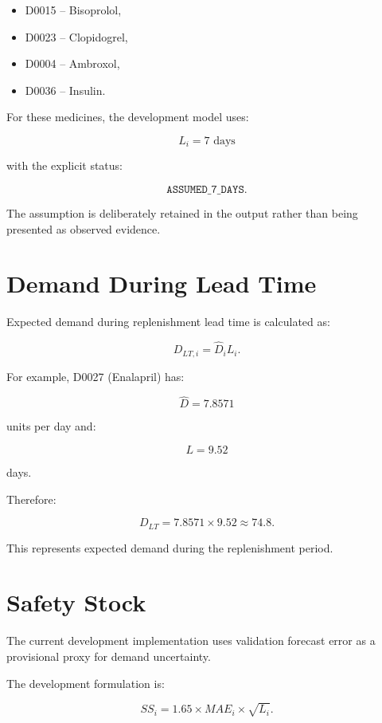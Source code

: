 \documentclass[11pt,a4paper]{article}
\begin{document}
\begin{itemize}
    \item D0015 -- Bisoprolol,
    \item D0023 -- Clopidogrel,
    \item D0004 -- Ambroxol,
    \item D0036 -- Insulin.
\end{itemize}

For these medicines, the development model uses:

\[
L_i = 7\text{ days}
\]

with the explicit status:

\[
\texttt{ASSUMED\_7\_DAYS}.
\]

The assumption is deliberately retained in the output rather than
being presented as observed evidence.

\section{Demand During Lead Time}

Expected demand during replenishment lead time is calculated as:

\[
D_{LT,i}
=
\widehat{D}_i L_i.
\]

For example, D0027 (Enalapril) has:

\[
\widehat{D}=7.8571
\]

units per day and:

\[
L=9.52
\]

days.

Therefore:

\[
D_{LT}
=
7.8571\times9.52
\approx74.8.
\]

This represents expected demand during the replenishment period.

\section{Safety Stock}

The current development implementation uses validation forecast
error as a provisional proxy for demand uncertainty.

The development formulation is:

\[
SS_i
=
1.65
\times
MAE_i
\times
\sqrt{L_i}.
\]
\end{document}
